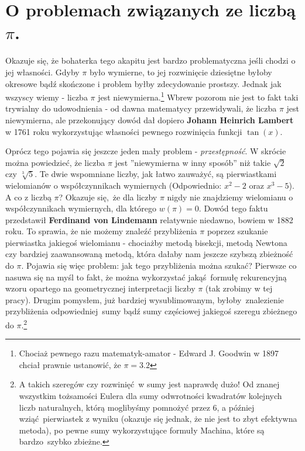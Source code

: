 \documentclass[10pt,wide]{mwart}
\theoremstyle{definition}
\begin{document}
 \section{O problemach związanych ze liczbą \(\pi\).}
 \par Okazuje się, że bohaterka tego akapitu jest bardzo problematyczna jeśli chodzi o jej własności.
 Gdyby \(\pi\) było wymierne, to jej rozwinięcie dziesiętne byłoby okresowe bądź skończone i problem byłby zdecydowanie prostszy.
 Jednak jak wszyscy wiemy - liczba \(\pi\) jest niewymierna.\footnote{Chociaż pewnego razu matematyk-amator - Edward J. Goodwin w 1897 chciał prawnie ustanowić, że \(\pi = 3.2\)} Wbrew pozorom nie jest to fakt taki trywialny do udowodnienia -
 od dawna matematycy przewidywali, że liczba \(\pi\) jest niewymierna, ale przekonujący dowód dał dopiero \textbf{Johann Heinrich Lambert} w 1761 roku wykorzystując własności pewnego rozwinięcia funkcji \(\tan(x)\).
 \par Oprócz tego pojawia się jeszcze jeden mały problem - \emph{przestępność}. W skrócie można powiedzieć, że liczba \(\pi\) jest ''niewymierna w inny sposób'' niż takie \(\sqrt{2}\) czy \(\sqrt[3]{5}\).
 Te dwie wspomniane liczby, jak łatwo zauważyć, są pierwiastkami wielomianów o współczynnikach wymiernych (Odpowiednio: \(x^2 - 2\) oraz \(x^3 - 5\)).
 A co z liczbą \(\pi\)? Okazuje się, że dla liczby \(\pi\) nigdy nie znajdziemy wielomianu o współczynnikach wymiernych, dla którego \(w(\pi) = 0\).
 Dowód tego faktu przedstawił \textbf{Ferdinand von Lindemann} relatywnie niedawno, bowiem w 1882 roku.
 To sprawia, że nie możemy znaleźć przybliżenia \(\pi\) poprzez szukanie pierwiastka jakiegoś wielomianu - chociażby metodą bisekcji, metodą Newtona czy bardziej zaawansowaną metodą, która dałaby nam jeszcze szybszą zbieżność do \(\pi\).
 Pojawia się więc problem: jak tego przybliżenia można szukać?
 Pierwsze co nasuwa się na myśl to fakt, że można wykorzystać jakąś formułę rekurencyjną wzoru opartego na geometrycznej interpretacji liczby \(\pi\) (tak zrobimy w tej pracy).
 Drugim pomysłem, już bardziej wysublimowanym, byłoby znalezienie przybliżenia odpowiedniej sumy bądź sumy częściowej jakiegoś szeregu zbieżnego do \(\pi\).\footnote{A takich szeregów czy rozwinięć w sumy jest naprawdę dużo! Od znanej wszystkim tożsamości Eulera dla sumy odwrotności kwadratów kolejnych liczb naturalnych,
 którą moglibyśmy pomnożyć przez 6, a później wziąć pierwiastek z wyniku (okazuje się jednak, że nie jest to zbyt efektywna metoda), po pewne sumy wykorzystujące formuły Machina, które są bardzo szybko zbieżne.}
\end{document}
